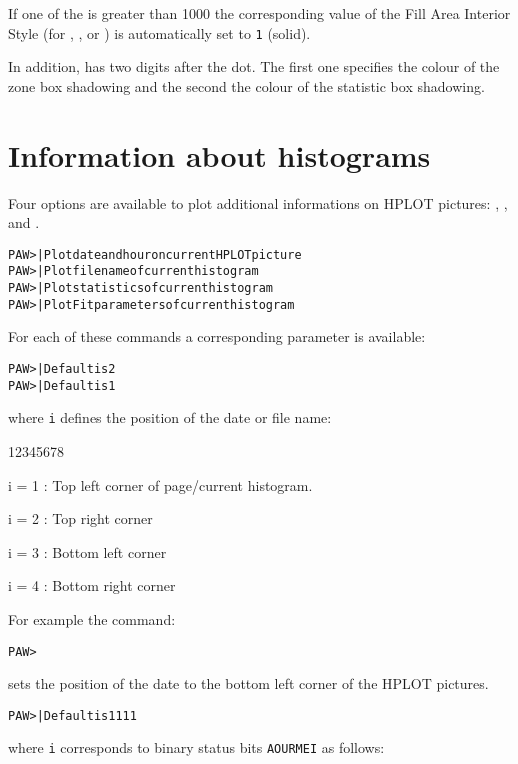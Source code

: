 If one of the  is greater than 1000 the corresponding value of the
Fill Area Interior Style (for , ,  or 
) is automatically set to \texttt{1} (solid).

In addition,  has two digits after the dot. The first one specifies
the colour of the zone box shadowing and the second the colour
of the statistic box shadowing. 

\section{Information about histograms}

Four options are available to plot additional informations on HPLOT pictures:
, ,  and .

\begin{alltt}
PAW >         | Plot date and hour on current HPLOT picture
PAW >         | Plot file name of current histogram
PAW >         | Plot statistics of current histogram
PAW >          | Plot Fit parameters of current histogram
\end{alltt}

For each of these  commands a corresponding 
 parameter is available:

\begin{alltt}
PAW >     | Default is 2
PAW >     | Default is 1
\end{alltt}
where \texttt{i} defines the position of the date or file name:

\begin{DLtt}{12345678}
\item[i = 1 :] Top left corner        of page/current histogram.
\item[i = 2 :] Top right corner
\item[i = 3 :] Bottom left corner
\item[i = 4 :] Bottom right corner
\end{DLtt}

For example the command:
\begin{alltt}
PAW > 
\end{alltt}
sets the position of the date to the bottom left corner of the HPLOT pictures.
\begin{alltt}
PAW >     | Default is 1111
\end{alltt}
where \texttt{i} corresponds to binary status bits \texttt{AOURMEI} as follows: 

